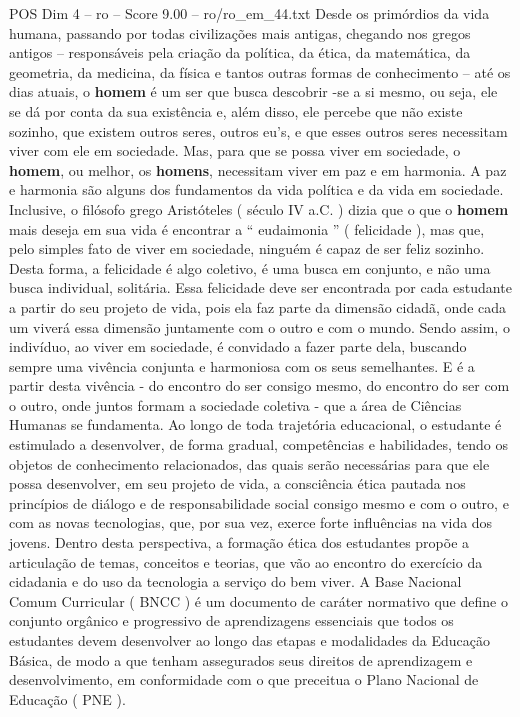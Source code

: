 \begin{textsample}{POS Dim 4 – ro – Score 9.00 – ro/ro\_em\_44.txt}
Desde os primórdios da vida humana, passando por todas civilizações mais antigas, chegando nos gregos antigos – responsáveis pela criação da política, da ética, da matemática, da geometria, da medicina, da física e tantos outras formas de conhecimento – até os dias atuais, o \textbf{homem} é um ser que busca descobrir -se a si mesmo, ou seja, ele se dá por conta da sua existência e, além disso, ele percebe que não existe sozinho, que existem outros seres, outros eu’s, e que esses outros seres necessitam viver com ele em sociedade.
Mas, para que se possa viver em sociedade, o \textbf{homem}, ou melhor, os \textbf{homens}, necessitam viver em paz e em harmonia.
A paz e harmonia são alguns dos fundamentos da vida política e da vida em sociedade.
Inclusive, o filósofo grego Aristóteles ( século IV a.C. ) dizia que o que o \textbf{homem} mais deseja em sua vida é encontrar a “ eudaimonia ” ( felicidade ), mas que, pelo simples fato de viver em sociedade, ninguém é capaz de ser feliz sozinho.
Desta forma, a felicidade é algo coletivo, é uma busca em conjunto, e não uma busca individual, solitária.
Essa felicidade deve ser encontrada por cada estudante a partir do seu projeto de vida, pois ela faz parte da dimensão cidadã, onde cada um viverá essa dimensão juntamente com o outro e com o mundo.
Sendo assim, o indivíduo, ao viver em sociedade, é convidado a fazer parte dela, buscando sempre uma vivência conjunta e harmoniosa com os seus semelhantes.
E é a partir desta vivência - do encontro do ser consigo mesmo, do encontro do ser com o outro, onde juntos formam a sociedade coletiva - que a área de Ciências Humanas se fundamenta.
Ao longo de toda trajetória educacional, o estudante é estimulado a desenvolver, de forma gradual, competências e habilidades, tendo os objetos de conhecimento relacionados, das quais serão necessárias para que ele possa desenvolver, em seu projeto de vida, a consciência ética pautada nos princípios de diálogo e de responsabilidade social consigo mesmo e com o outro, e com as novas tecnologias, que, por sua vez, exerce forte influências na vida dos jovens.
Dentro desta perspectiva, a formação ética dos estudantes propõe a articulação de temas, conceitos e teorias, que vão ao encontro do exercício da cidadania e do uso da tecnologia a serviço do bem viver.
A Base Nacional Comum Curricular ( BNCC ) é um documento de caráter normativo que define o conjunto orgânico e progressivo de aprendizagens essenciais que todos os estudantes devem desenvolver ao longo das etapas e modalidades da Educação Básica, de modo a que tenham assegurados seus direitos de aprendizagem e desenvolvimento, em conformidade com o que preceitua o Plano Nacional de Educação ( PNE ).

\end{textsample}
